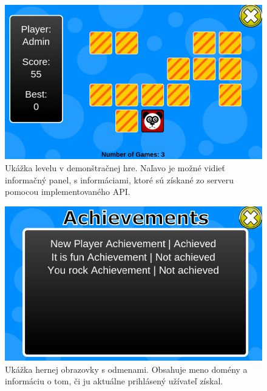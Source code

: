 \begin{figure}[h]
  \centering
  \includegraphics[scale=0.45]{fig/ukazka-hra.png}
  \caption{Ukážka levelu v demonštračnej hre. Naľavo je možné vidieť informačný panel, s informáciami, ktoré sú získané zo serveru pomocou implementovaného API.}
  \label{fig:ukazka-hra}
\end{figure}

\begin{figure}[h]
  \centering
  \includegraphics[scale=0.45]{fig/ukazka-hra-odmeny.png}
  \caption{Ukážka hernej obrazovky s odmenami. Obsahuje meno domény a informáciu o tom, či ju aktuálne prihlásený užívateľ získal.}
  \label{fig:ukazka-hraodmen}
\end{figure}




